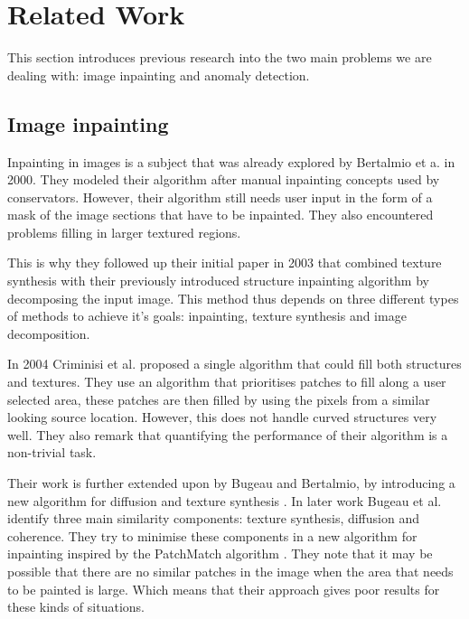 \chapter{Related Work}\label{ch:related-work}

This section introduces previous research into the two main problems we are dealing with: image inpainting and anomaly detection.

\section{Image inpainting}

Inpainting in images is a subject that was already explored by Bertalmio et a. \cite{bertalmio_image_2000} in 2000. They modeled their algorithm after manual inpainting concepts used by conservators. However, their algorithm still needs user input in the form of a mask of the image sections that have to be inpainted. They also encountered problems filling in larger textured regions.

This is why they followed up their initial paper in 2003 \cite{bertalmio_simultaneous_2003} that combined texture synthesis with their previously introduced structure inpainting algorithm by decomposing the input image. This method thus depends on three different types of methods to achieve it's goals: inpainting, texture synthesis and image decomposition. 

In 2004 Criminisi et al. \cite{criminisi_region_2004} proposed a single algorithm that could fill both structures and textures. They use an algorithm that prioritises patches to fill along a user selected area, these patches are then filled by using the pixels from a similar looking source location. However, this does not handle curved structures very well. They also remark that quantifying the performance of their algorithm is a non-trivial task.

Their work is further extended upon by Bugeau and Bertalmio, by introducing a new algorithm for diffusion and texture synthesis \cite{bugeau_combining_2009}. In later work Bugeau et al. \cite{bugeau_comprehensive_2010} identify three main similarity components: texture synthesis, diffusion and coherence. They try to minimise these components in a new algorithm for inpainting inspired by the PatchMatch algorithm \cite{barnes_patchmatch_2009}. They note that it may be possible that there are no similar patches in the image when the area that needs to be painted is large. Which means that their approach gives poor results for these kinds of situations.

